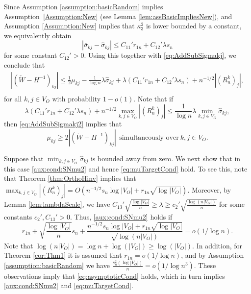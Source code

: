 \documentclass[opre,nonblindrev]{informs3} %
\begin{document}
\begin{APPENDIX}{}
Since Assumption \ref{assumption:basicRandom} implies Assumption~\ref{Assumption:New}
(see Lemma \ref{lem:assBasicImpliesNew}), and  Assumption \ref{Assumption:New} implies that $\kappa^2_{3} $ is lower bounded by a constant, we equivalently  obtain
\begin{equation} \label{eq:boundSigmaDiff}
|\bar\sigma_{kj}-\hat\sigma_{kj}| \leq
C_{11}' r_{1n} + C_{12}'  \lambda s_n
\end{equation}
for some constant $C_{12}'>0$.
Using this together with \eqref{eq:AddSubSigmakj}, we conclude that
\begin{equation}\label{eq:AddSubSigmakj2}
\begin{array}{rl}
|(\check W - H^{-1})_{kj}| \leq  \frac{1}{2}\mu_{kj} - \frac{1}{\log n}\lambda \hat\sigma_{kj}+ 
 \lambda
\left( C_{11}' r_{1n} + C_{12}'\lambda s_n \right)
+ n^{-1/2}|(R^k_{n})_j|, \\
\end{array}
\end{equation}
for all $k,j\in V_O$ with probability $1-o(1)$.
Note that if 
\begin{equation}\label{aux:cond:SNmu2}
\lambda
\left( C_{11}' r_{1n} + C_{12}'\lambda s_n\right)
+ n^{-1/2} \max_{k,j\in V_O}
|(R^k_{n})_j| \leq  \frac{1}{\log n}\lambda \min_{k,j\in V_O} \hat\sigma_{kj},
\end{equation}
then \eqref{eq:AddSubSigmakj2} implies that 
\begin{equation} \label{eq:muTargetCond}
 \mu_{kj} \geq 2|(\check W - H^{-1})_{kj}| \ \  \mbox{simultaneously over} \ k,j\in V_O.
\end{equation}

Suppose that $\min_{k,j\in V_O} \hat\sigma_{kj}$ is bounded away from zero. We next show that in this case \eqref{aux:cond:SNmu2} and hence \eqref{eq:muTargetCond} hold.
To see this, note that Theorem \ref{thm:OrthoHinv} implies that
$\max_{k,j\in V_O} |(R^k_{n})_j|= O(n^{-1/2}s_n\log |V_O| + r_{1n}\sqrt{\log |V_O|})$.
Moreover, by Lemma \ref{lem:lambdaScale}, we have 
 $C_{13}' 
  \sqrt{\frac{\log |V_O|}{n}} \geq 
 \lambda \geq c_2' \sqrt{\frac{\log{(n|V_O|)}}{n}}$ for some constants $c_2',C_{13}'>0$. Thus, \eqref{aux:cond:SNmu2} holds if
 \begin{equation} \label{eq:asymptoticCond}
 r_{1n} +  \sqrt{\frac{\log |V_O|}{n}}  s_n + \frac{{n^{-1/2}s_n\log |V_O| + r_{1n}\sqrt{\log |V_O|}} }{{\sqrt{\log(n|V_O|)}} } = o(1/\log n).
 \end{equation}
Note that  $\log(n|V_O|) = \log n + \log(|V_O|) \geq \log(|V_O|)$.
In addition, 
for Theorem \ref{cor:Thm1}
it is assumed that
$r_{1n} = o(1/\log n)$, and by Assumption \ref{assumption:basicRandom}
we have
 $ \frac{ s_n^2(\log |V_O|) }{n}  = o(1/\log n^3)	$.
 These observations
imply that \eqref{eq:asymptoticCond} holds, which  in turn implies 
\eqref{aux:cond:SNmu2} and \eqref{eq:muTargetCond}.  


\end{APPENDIX}
\end{document}
